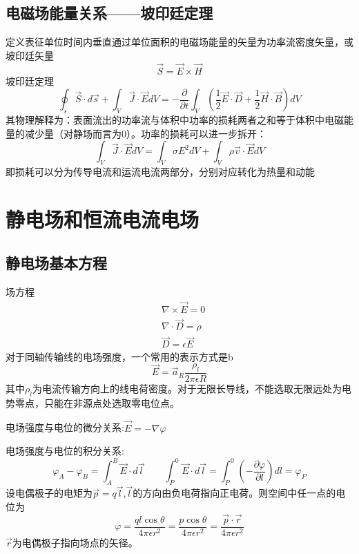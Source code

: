 \documentclass{ctexart}
\begin{document}
\subsection{电磁场能量关系——坡印廷定理}
定义表征单位时间内垂直通过单位面积的电磁场能量的矢量为功率流密度矢量，或坡印廷矢量
\begin{equation}
    \vec{S}=\vec{E}\times \vec{H}
\end{equation}
坡印廷定理
\begin{equation}
    \oint_s \vec{S}\cdot d\vec{s}+\int_V\vec{J}\cdot \vec{E}dV=-\dfrac{\partial}{\partial t}\int_V\left( \dfrac{1}{2}\vec{E}\cdot \vec{D}+ \dfrac{1}{2}\vec{H}\cdot \vec{B} \right)dV
\end{equation}
其物理解释为：表面流出的功率流与体积中功率的损耗两者之和等于体积中电磁能量的减少量（对静场而言为0）。功率的损耗可以进一步拆开：
\begin{equation}
    \int_V\vec{J}\cdot \vec{E}dV=\int_V\sigma E^2dV+\int_V\rho \vec{v}\cdot \vec{E}dV
\end{equation}
即损耗可以分为传导电流和运流电流两部分，分别对应转化为热量和动能
\section{静电场和恒流电流电场}
\subsection{静电场基本方程}
场方程
\begin{align}
    &\nabla \times \vec{E}=0\\
    &\nabla \cdot \vec{D}=\rho\\
    &\vec{D}=\epsilon \vec{E}
\end{align}
对于同轴传输线的电场强度，一个常用的表示方式是b
\begin{equation}
    \vec{E}=\vec{a}_R \dfrac{\rho_l}{2\pi \epsilon R}
\end{equation}
其中$\rho_l$为电流传输方向上的线电荷密度。对于无限长导线，不能选取无限远处为电势零点，只能在非源点处选取零电位点。

电场强度与电位的微分关系:$\vec{E}=-\nabla \varphi$

电场强度与电位的积分关系:
\begin{equation}
    \varphi_A-\varphi_B=\int_{A}^{B}\vec{E}\cdot d\vec{l} \qquad \int_{P}^{0}\vec{E}\cdot d\vec{l}=\int_{P}^{0}(-\dfrac{\partial \varphi}{\partial l})dl=\varphi_P
\end{equation}
设电偶极子的电矩为$\vec{p}=q\vec{l}$,$\vec{l}$的方向由负电荷指向正电荷。则空间中任一点的电位为
\begin{equation}
    \varphi=\dfrac{ql \cos \theta}{4 \pi \epsilon r^2}=\dfrac{p\cos \theta}{4 \pi \epsilon r^2}=\dfrac{\vec{p}\cdot \vec{r}}{4 \pi \epsilon r^2}
\end{equation}
$\vec{r}$为电偶极子指向场点的矢径。
\end{document}
